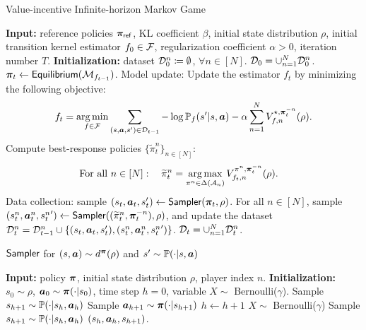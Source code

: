 \begin{algorithm}[!thb]
    \caption{Value-incentive Infinite-horizon Markov Game}
    \label{alg:markov_game_infinite}
    \begin{algorithmic}[1]
    \STATE \textbf{Input:} reference policies ${\bm{\pi}}_{\mathsf{ref}}$, KL coefficient $\beta$, initial state distribution $\rho$, initial transition kernel estimator $f_0\in{\mathcal{F}}$, regularization coefficient $\alpha>0$, iteration number $T$.
    \STATE \textbf{Initialization:} dataset ${\mathcal{D}}_0^n\coloneqq \emptyset$, $\forall n\in[N]$. ${\mathcal{D}}_0 = \cup_{n=1}^N {\mathcal{D}}_0^n$.
    \STATE ${\bm{\pi}}_t \leftarrow \mathsf{Equilibrium}({\mathcal{M}}_{f_{t-1}})$. 
    \STATE Model update: Update the estimator $f_t$ by minimizing the following objective:
    \begin{align}\label{eq:model_update_mg_infinite}         
        f_t=\operatorname*{arg\,min}_{f\in{\mathcal{F}}}\sum_{(s,{\bm{a}},s')\in{\mathcal{D}}_{t-1}}-\log {\mathbb P}_f(s'|s,{\bm{a}}) -\alpha \sum_{n=1}^N V_{f,n}^{\star,{\bm{\pi}}_t^{-n}}(\rho).
    \end{align}
    \STATE Compute best-response policies $\{\widetilde{\pi}_t^n\}_{n\in[N]}$:
    \begin{align}\label{eq:policy_update_2_mg_infinite}
        \text{For all }n\in[N]:\quad \widetilde{\pi}_t^n& = \operatorname*{arg\,max}_{\pi^n\in\Delta({\mathcal{A}}_n)} V_{f_t,n}^{\pi^n,{\bm{\pi}}_t^{-n}}(\rho).
    \end{align}
    \STATE Data collection: sample $(s_t,{\bm{a}}_t,s_t')\leftarrow \mathsf{Sampler}({\bm{\pi}}_t,\rho)$.
    For all $n\in[N]$, sample 
    $(s_{t}^n,{\bm{a}}_{t}^n,{s_{t}^n}')\leftarrow \mathsf{Sampler}((\widetilde{\pi}_t^n,{\bm{\pi}}_t^{-n}),\rho)$, and update the dataset ${\mathcal{D}}_t^n = {\mathcal{D}}_{t-1}^n\cup\{(s_t,{\bm{a}}_t,s_t'),(s_t^n,{\bm{a}}_{t}^n,{s_t^n}')\}$. ${\mathcal{D}}_t = \cup_{n=1}^N {\mathcal{D}}_t^n$.
    \ENDFOR 
    \end{algorithmic}
\end{algorithm}

\begin{algorithm}[!thb]
    \caption{$\mathsf{Sampler}$ for $(s,{\bm{a}})\sim d^{\bm{\pi}}(\rho)$ and $s'\sim {\mathbb P}(\cdot|s,{\bm{a}})$}
    \label{alg:sample}
    \begin{algorithmic}[1]
    \STATE \textbf{Input:} policy ${\bm{\pi}}$, initial state distribution $\rho$, player index $n$.
    \STATE \textbf{Initialization:} $s_0\sim \rho$, ${\bm{a}}_0\sim {\bm{\pi}}(\cdot|s_0)$, time step $h=0$, variable $X\sim$ Bernoulli($\gamma$).
        \STATE Sample $s_{h+1}\sim {\mathbb P}(\cdot|s_h,{\bm{a}}_h)$
        \STATE Sample ${\bm{a}}_{h+1}\sim {\bm{\pi}}(\cdot|s_{h+1})$
        \STATE $h\leftarrow h+1$
        \STATE $X\sim$ Bernoulli($\gamma$)
    \ENDWHILE
    \STATE Sample $s_{h+1}\sim {\mathbb P}(\cdot|s_h,{\bm{a}}_h)$
    \RETURN $(s_h,{\bm{a}}_h, s_{h+1})$.
    \end{algorithmic}
\end{algorithm}


